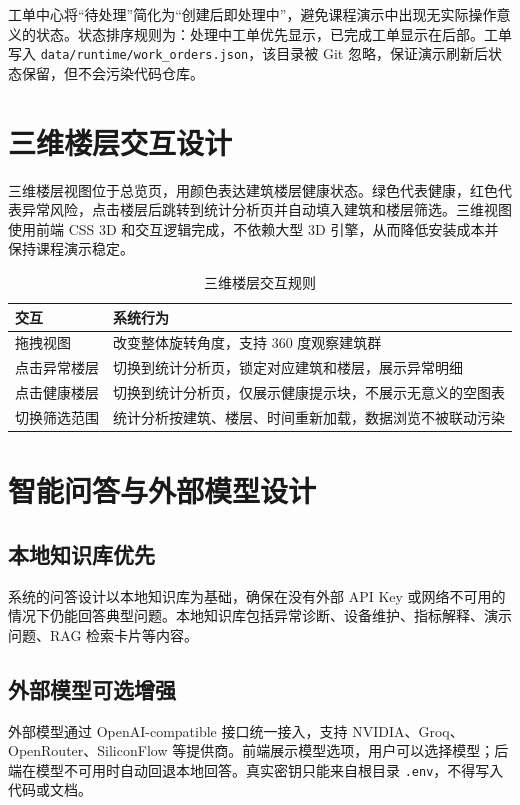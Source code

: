 \documentclass[12pt,a4paper]{ctexart}
\newcommand{\code}[1]{{\footnotesize\nolinkurl{#1}}}
\begin{document}
工单中心将“待处理”简化为“创建后即处理中”，避免课程演示中出现无实际操作意义的状态。状态排序规则为：处理中工单优先显示，已完成工单显示在后部。工单写入 \code{data/runtime/work_orders.json}，该目录被 Git 忽略，保证演示刷新后状态保留，但不会污染代码仓库。

\section{三维楼层交互设计}
三维楼层视图位于总览页，用颜色表达建筑楼层健康状态。绿色代表健康，红色代表异常风险，点击楼层后跳转到统计分析页并自动填入建筑和楼层筛选。三维视图使用前端 CSS 3D 和交互逻辑完成，不依赖大型 3D 引擎，从而降低安装成本并保持课程演示稳定。

\begin{table}[H]
\centering
\caption{三维楼层交互规则}
\begin{tabularx}{\textwidth}{p{4cm}Y}
\toprule
交互 & 系统行为 \\
\midrule
拖拽视图 & 改变整体旋转角度，支持 360 度观察建筑群 \\
点击异常楼层 & 切换到统计分析页，锁定对应建筑和楼层，展示异常明细 \\
点击健康楼层 & 切换到统计分析页，仅展示健康提示块，不展示无意义的空图表 \\
切换筛选范围 & 统计分析按建筑、楼层、时间重新加载，数据浏览不被联动污染 \\
\bottomrule
\end{tabularx}
\end{table}

\section{智能问答与外部模型设计}
\subsection{本地知识库优先}
系统的问答设计以本地知识库为基础，确保在没有外部 API Key 或网络不可用的情况下仍能回答典型问题。本地知识库包括异常诊断、设备维护、指标解释、演示问题、RAG 检索卡片等内容。

\subsection{外部模型可选增强}
外部模型通过 OpenAI-compatible 接口统一接入，支持 NVIDIA、Groq、OpenRouter、SiliconFlow 等提供商。前端展示模型选项，用户可以选择模型；后端在模型不可用时自动回退本地回答。真实密钥只能来自根目录 \code{.env}，不得写入代码或文档。
\end{document}
